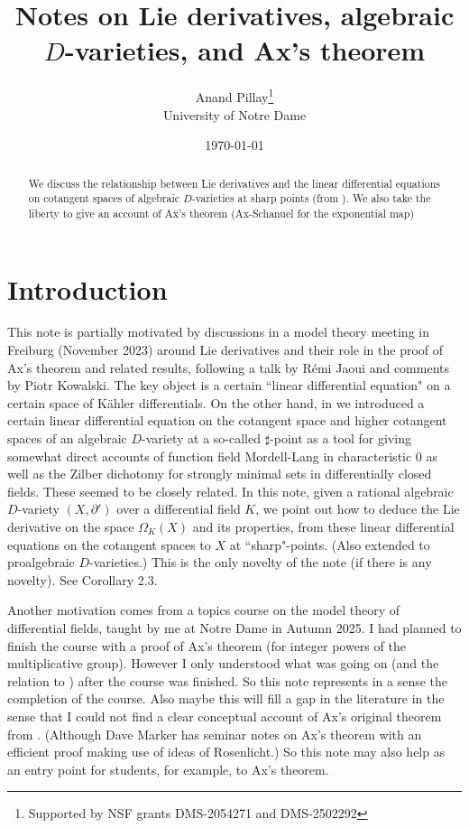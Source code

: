 \documentclass[12pt]{article}
\title{Notes on  Lie derivatives, algebraic $D$-varieties, and Ax's theorem}
\date{\today}
\author{Anand Pillay\thanks{Supported by NSF grants  DMS-2054271 and DMS-2502292}\\{University of Notre Dame}}
\begin{document}
\maketitle

\begin{abstract} 
We discuss the relationship between   Lie derivatives and the linear differential equations on cotangent spaces of algebraic $D$-varieties at sharp points (from  \cite{Pillay-Ziegler}). We also  take the  liberty to give an account of Ax's theorem  (Ax-Schanuel for the exponential map)

\end{abstract}


\section{Introduction}
This note is partially motivated by discussions in a model theory meeting in Freiburg (November 2023) around Lie derivatives and their role in the proof of Ax's theorem and related results, following a talk by R\'emi Jaoui and comments by Piotr Kowalski.  The  key object is a certain ``linear differential equation" on a certain space of K\"ahler differentials. On the other hand, in \cite{Pillay-Ziegler}  we introduced a certain linear differential equation on the cotangent space and higher cotangent spaces of an algebraic $D$-variety at a so-called $\sharp$-point as  a tool for giving somewhat direct accounts of function field Mordell-Lang in characteristic $0$ as well as the Zilber dichotomy for strongly minimal sets in differentially closed fields.  These seemed to be closely related.  In this note, given a rational  algebraic $D$-variety $(X,\partial ')$ over a differential field $K$, we point out how to deduce the Lie derivative on the  space $\Omega_{K}(X)$ and its properties, from these linear differential equations on the cotangent spaces to $X$ at ``sharp"-points.   (Also extended to proalgebraic $D$-varieties.) This is the only novelty of the note (if there is any novelty).  See Corollary 2.3.

Another motivation comes from a topics course on the model theory of differential fields, taught by me at Notre Dame in Autumn 2025.  I had planned to finish the course with a proof of Ax's theorem (for integer powers of the multiplicative group).  However I only understood what was going on (and the relation to \cite{Pillay-Ziegler}) after the course was finished.  So this note represents in  a sense the completion of the course.  Also maybe this will fill a gap in the literature in the sense that  I  could not find a clear conceptual account of Ax's original theorem from \cite{Ax}. (Although Dave Marker has seminar notes on Ax's theorem \cite{Marker}  with an efficient proof making use of ideas of Rosenlicht.) 
So this note may also help as an entry point for students, for example, to Ax's theorem. 
\end{document}
